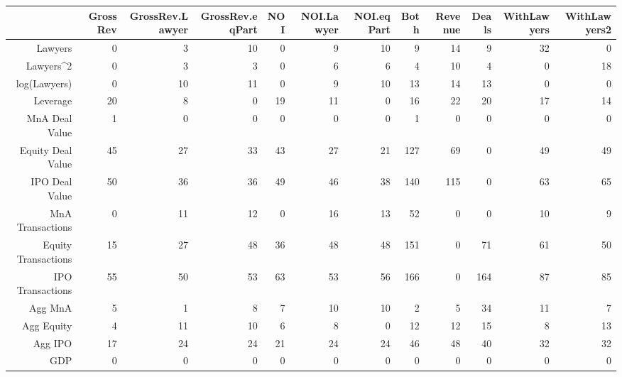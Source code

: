 \begin{table}[ht]
\centering
\begin{tabular}{rrrrrrrrrrrr}
  \hline
 & GrossRev & GrossRev.Lawyer & GrossRev.eqPart & NOI & NOI.Lawyer & NOI.eqPart & Both & Revenue & Deals & WithLawyers & WithLawyers2 \\ 
  \hline
Lawyers & 0 & 3 & 10 & 0 & 9 & 10 & 9 & 14 & 9 & 32 & 0 \\ 
  Lawyers^2 & 0 & 3 & 3 & 0 & 6 & 6 & 4 & 10 & 4 & 0 & 18 \\ 
  log(Lawyers) & 0 & 10 & 11 & 0 & 9 & 10 & 13 & 14 & 13 & 0 & 0 \\ 
  Leverage & 20 & 8 & 0 & 19 & 11 & 0 & 16 & 22 & 20 & 17 & 14 \\ 
  MnA Deal Value & 1 & 0 & 0 & 0 & 0 & 0 & 1 & 0 & 0 & 0 & 0 \\ 
  Equity Deal Value & 45 & 27 & 33 & 43 & 27 & 21 & 127 & 69 & 0 & 49 & 49 \\ 
  IPO Deal Value & 50 & 36 & 36 & 49 & 46 & 38 & 140 & 115 & 0 & 63 & 65 \\ 
  MnA Transactions & 0 & 11 & 12 & 0 & 16 & 13 & 52 & 0 & 0 & 10 & 9 \\ 
  Equity Transactions & 15 & 27 & 48 & 36 & 48 & 48 & 151 & 0 & 71 & 61 & 50 \\ 
  IPO Transactions & 55 & 50 & 53 & 63 & 53 & 56 & 166 & 0 & 164 & 87 & 85 \\ 
  Agg MnA & 5 & 1 & 8 & 7 & 10 & 10 & 2 & 5 & 34 & 11 & 7 \\ 
  Agg Equity & 4 & 11 & 10 & 6 & 8 & 0 & 12 & 12 & 15 & 8 & 13 \\ 
  Agg IPO & 17 & 24 & 24 & 21 & 24 & 24 & 46 & 48 & 40 & 32 & 32 \\ 
  GDP & 0 & 0 & 0 & 0 & 0 & 0 & 0 & 0 & 0 & 0 & 0 \\ 
   \hline
\end{tabular}
\end{table}
